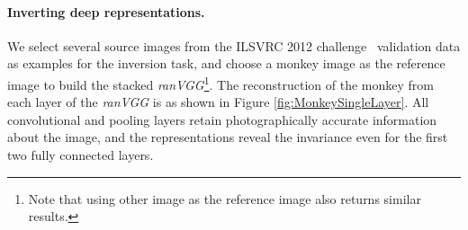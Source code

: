\documentclass{article}
\begin{document}
\label{sec:experiments}
%


\paragraph{Inverting deep representations.}

We select several source images from the ILSVRC 2012 challenge~\cite{ILSVRC} validation data as examples for the inversion task,
and choose a monkey image as the reference image to build the stacked \emph{ranVGG}\footnote{Note that using other image as the reference image also returns similar results.}.
The reconstruction of the monkey from each layer of the \emph{ranVGG} is as shown in Figure \ref{fig:MonkeySingleLayer}.
All convolutional and pooling layers retain photographically accurate information about the image,
and the representations reveal the invariance even for the first two fully connected layers.%
\end{document}

